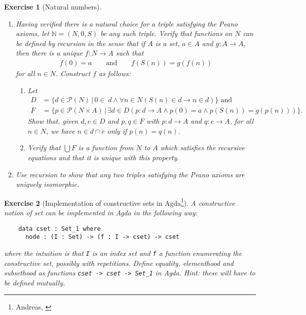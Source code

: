 \documentclass{scrartcl}
\theoremstyle{definition}
\theoremstyle{plain}
\theoremstyle{remark}
\newcommand{\N}{\ensuremath{\mathbb{N}}}
\newcommand{\limp}{\rightarrow}
\newcommand{\Pow}{\mathcal{P}}
\newcommand{\sep}{\,|\,}
\theoremstyle{plain}
\newtheorem{Exc}{Exercise}
\begin{document}
\begin{Exc}[Natural numbers\label{exc:nat}]
\begin{enumerate}
\begin{enumerate}
    \end{enumerate}
  \item Having verified there is a natural choice for a triple satisfying the Peano axioms, let $\N = (N,0,S)$ be any such triple. Verify that functions on $N$ can be defined by recursion in the sense that if $A$ is a set, $a \in A$ and $g : A \longrightarrow A$, then there is a unique $f : N \longrightarrow A$ such that
    \begin{align*}
      f(0) = a
      \qquad \text{and} \qquad
      f(S(n)) = g(f(n))
    \end{align*}
    for all $n \in N$. Construct $f$ as follows:
    \begin{enumerate}
    \item Let
      \begin{align*}
        D &= \{d \in \Pow(N) \sep 0 \in\ d \land \forall n \in N (S(n) \in d \limp n \in d)\}\text{ and}\\
        F &= \{p \in \Pow(N \times A) \sep \exists d \in D (p : d \longrightarrow A \land p(0) = a \land p(S(n)) = g(p(n)))\}\mbox{.}
      \end{align*}
      Show that, given $d,e \in D$ and $p,q \in F$ with $p : d \longrightarrow A$ and $q : e \longrightarrow A$, for all $n \in N$, we have $n \in d \cap e$ only if $p(n) = q(n)$.
    \item Verify that $\bigcup F$ is a function from $N$ to $A$ which satisfies the recursive equations and that it is unique with this property.
    \end{enumerate}
  \item Use recursion to show that any two triples satisfying the Peano axioms are uniquely isomorphic.
  \end{enumerate}
\end{Exc}
\pagebreak
\begin{Exc}[Implementation of constructive sets in Agda\footnote{Andreas, \cite{aczel:1978}}]
  A constructive notion of set can be implemented in Agda in the following way:
  \begin{verbatim}
    data cset : Set_1 where
      node : (I : Set) -> (f : I -> cset) -> cset
  \end{verbatim}
  where the intuition is that \verb|I| is an index set and \verb|f| a function enumerating the constructive set, possibly with repetitions. Define equality, elementhood and subsethood as functions \verb|cset -> cset -> Set_1| in Agda. Hint: these will have to be defined mutually.
\end{Exc}



\end{document}
